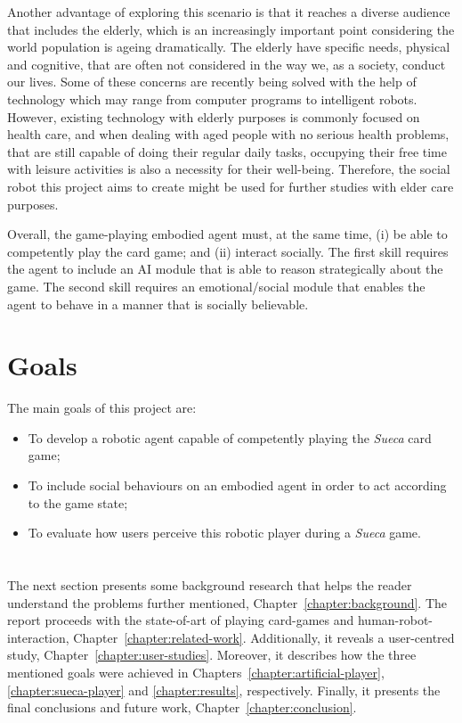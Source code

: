 Another advantage of exploring this scenario is that it reaches a diverse audience that includes the elderly, which is an increasingly important point considering the world population is ageing dramatically.
The elderly have specific needs, physical and cognitive, that are often not considered in the way we, as a society, conduct our lives.
Some of these concerns are recently being solved with the help of technology which may range from computer programs to intelligent robots.
However, existing technology with elderly purposes is commonly focused on health care, and when dealing with aged people with no serious health problems, that are still capable of doing their regular daily tasks, occupying their free time with leisure activities is also a necessity for their well-being.
Therefore, the social robot this project aims to create might be used for further studies with elder care purposes.

Overall, the game-playing embodied agent must, at the same time, (i) be able to competently play the card game; and (ii) interact socially. The first skill requires the agent to include an AI module that is able to reason strategically about the game. The second skill requires an emotional/social module that enables the agent to behave in a manner that is socially believable.


\section{Goals}
\label{sec:goals}

The main goals of this project are:
\begin{itemize}
\item To develop a robotic agent capable of competently playing the \emph{Sueca} card game;
\item To include social behaviours on an embodied agent in order to act according to the game state;
\item To evaluate how users perceive this robotic player during a \emph{Sueca} game.
\end{itemize}

\section*{\centering*}

The next section presents some background research that helps the reader understand the problems further mentioned, Chapter~\ref{chapter:background}.
The report proceeds with the state-of-art of playing card-games and human-robot-interaction, Chapter~\ref{chapter:related-work}.
Additionally, it reveals a user-centred study, Chapter~\ref{chapter:user-studies}.
Moreover, it describes how the three mentioned goals were achieved in Chapters~\ref{chapter:artificial-player}, \ref{chapter:sueca-player} and \ref{chapter:results}, respectively.
Finally, it presents the final conclusions and future work, Chapter~\ref{chapter:conclusion}.
